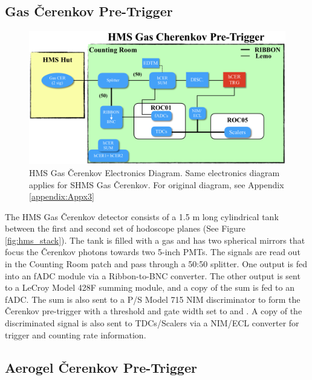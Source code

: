 \documentclass[11pt]{article}
\begin{document}
\subsection{Gas \v{C}erenkov Pre-Trigger} \label{hms_cer_section}
\begin{figure}[h!]
  \centering
  \includegraphics[scale=0.5]{hCER_diagram.png}
  \caption{HMS Gas \v{C}erenkov Electronics Diagram. Same electronics diagram applies for SHMS Gas \v{C}erenkov. For original diagram, see Appendix \ref{appendix:Appx3} }
  \label{fig:hCER_diagram}
\end{figure}

\indent The HMS Gas \v{C}erenkov detector consists of a 1.5 m long cylindrical tank between the first and second set of hodoscope planes (See Figure \ref{fig:hms_stack}).
The tank is filled with a gas and has two spherical mirrors that focus the \v{C}erenkov photons towards two 5-inch PMTs\cite{hms_cer_article}. The
signals are read out in the Counting Room patch and pass through a 50:50 splitter. One output is fed into
an fADC module via a Ribbon-to-BNC converter. The other output is sent to a LeCroy Model 428F summing module, and a copy of the sum is fed to an fADC. The sum is
also sent to a P/S Model 715 NIM discriminator to form the \v{C}erenkov pre-trigger with a threshold and gate width set to \hcerthrs and \hcergate. A copy of the discriminated signal is also sent to TDCs/Scalers via a NIM/ECL converter for trigger and counting rate information.


\subsection{Aerogel \v{C}erenkov Pre-Trigger}
\end{document}
